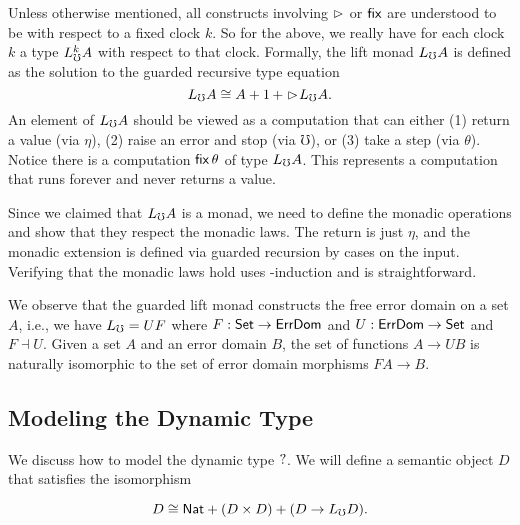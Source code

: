 Unless otherwise mentioned, all constructs involving $\vartriangleright$ or $\mathsf{fix}$ are
understood to be with respect to a fixed clock $k$. So for the above, we really
have for each clock $k$ a type $L_\mho^k A$ with respect to that clock.
%
Formally, the lift monad $L_\mho A$ is defined as the solution to the guarded
recursive type equation
%
\[ L_\mho A \cong A + 1\, + \vartriangleright \hspace{-0.2em} L_\mho A. \]
%
An element of $L_\mho A$ should be viewed as a computation that can either (1)
return a value (via $\eta$), (2) raise an error and stop (via $\mho$), or (3)
take a step (via $\theta$).
%
Notice there is a computation $\mathsf{fix}\, \theta$ of type $L_\mho A$. This represents a
computation that runs forever and never returns a value.

Since we claimed that $L_\mho A$ is a monad, we need to define the monadic
operations and show that they respect the monadic laws. The return is just
$\eta$, and the monadic extension is defined via guarded recursion by cases on
the input.
%
%
Verifying that the monadic laws hold uses \lob-induction and is straightforward.

We observe that the guarded lift monad constructs the free error domain on a set
$A$, i.e., we have $L_\mho = UF$ where $F : \mathsf{Set} \to \textsf{ErrDom}$ and $U : \textsf{ErrDom} \to
\mathsf{Set}$ and $F \dashv U$. Given a set $A$ and an error domain $B$, the set of
functions $A \to UB$ is naturally isomorphic to the set of error domain
morphisms $FA \to B$.



\subsection{Modeling the Dynamic Type}\label{sec:dynamic-type}

We discuss how to model the dynamic type $?$.
We will define a semantic object $D$ that satisfies the isomorphism

\[ D \cong \mathsf{Nat} + (D \times D) + (D \to L_\mho D). \]

